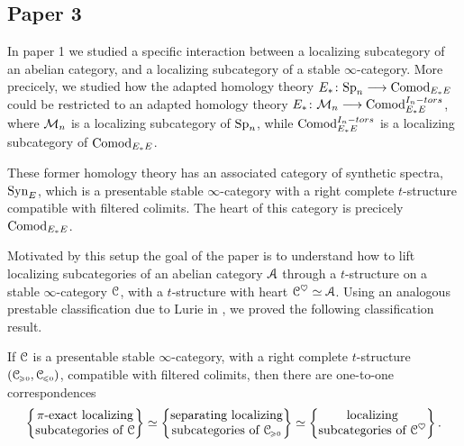 

\subsection{Paper 3}

In paper 1 we studied a specific interaction between a localizing subcategory of an abelian category, and a localizing subcategory of a stable $\infty$-category. More precicely, we studied how the adapted homology theory $E_* \colon \mathrm{Sp}_{n} \longrightarrow \mathrm{Comod}_{E_*E}$ could be restricted to an adapted homology theory $E_* \colon \mathcal{M}_{n} \longrightarrow \mathrm{Comod}_{E_*E}^{I_n-tors}$, where $\mathcal{M}_{n}$ is a localizing subcategory of $\mathrm{Sp}_{n}$, while $\mathrm{Comod}_{E_*E}^{I_n-tors}$ is a localizing subcategory of $\mathrm{Comod}_{E_*E}$. 

These former homology theory has an associated category of synthetic spectra, $\mathrm{Syn}_{E}$, which is a presentable stable $\infty$-category with a right complete $t$-structure compatible with filtered colimits. The heart of this category is precicely $\mathrm{Comod}_{E_*E}$. 

Motivated by this setup the goal of the paper \cite{aambo_2024_localizing} is to understand how to lift localizing subcategories of an abelian category $\EuScript{A}$ through a $t$-structure on a stable $\infty$-category $\EuScript{C}$, with a $t$-structure with heart $\EuScript{C}^\heartsuit \simeq \EuScript{A}$. Using an analogous prestable classification due to Lurie in \citeme, we proved the following classification result. 

\begin{theorem}
    If $\EuScript{C}$ is a presentable stable $\infty$-category, with a right complete $t$-structure $(\EuScript{C}_{\hspace{-1pt}\scriptscriptstyle\geqslant 0}, \EuScript{C}_{\hspace{-1pt}\scriptscriptstyle\leqslant 0})$, compatible with filtered colimits, then there are one-to-one correspondences 
    \[\left\{ \begin{matrix} \pi\text{-exact localizing}\\ \text{subcategories of }\EuScript{C} \end{matrix} \right\} \simeq \left\{ \begin{matrix} \text{separating localizing}\\ \text{subcategories of }\EuScript{C}_{\hspace{-1pt}\scriptscriptstyle\geqslant 0} \end{matrix} \right\} \simeq \left\{ \begin{matrix} \text{localizing}\\ \text{subcategories of }\EuScript{C}^\heartsuit \end{matrix} \right\}.\]
\end{theorem}
